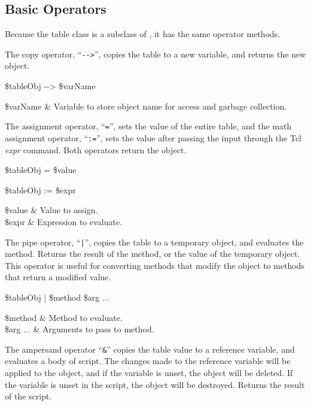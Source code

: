 \clearpage

\subsection{Basic Operators}
Because the table class is a subclass of , it has the same operator methods. 

The copy operator, ``\texttt{-{}->}'', copies the table to a new variable, and returns the new object.
\begin{syntax}
 \$tableObj -{}-> \$varName
\end{syntax} 
\begin{args}
\$varName & Variable to store object name for access and garbage collection. 
\end{args}

The assignment operator, ``\texttt{=}'', sets the value of the entire table, and the math assignment operator, ``\texttt{:=}'', sets the value after passing the input through the Tcl \textit{expr} command. 
Both operators return the object.

\begin{syntax}
 \$tableObj = \$value
\end{syntax}
\begin{syntax}
 \$tableObj := \$expr
\end{syntax}

\begin{args}
\$value & Value to assign. \\
\$expr & Expression to evaluate.
\end{args}

The pipe operator, ``\texttt{|}'', copies the table to a temporary object, and evaluates the method.
Returns the result of the method, or the value of the temporary object.
This operator is useful for converting methods that modify the object to methods that return a modified value.

\begin{syntax}
 \$tableObj | \$method \$arg ...
\end{syntax}

\begin{args}
\$method & Method to evaluate. \\
\$arg ... & Arguments to pass to method.
\end{args}

The ampersand operator ``\texttt{\&}'' copies the table value to a reference variable, and evaluates a body of script. 
The changes made to the reference variable will be applied to the object, and if the variable is unset, the object will be deleted.
If the variable is unset in the script, the object will be destroyed.
Returns the result of the script.

